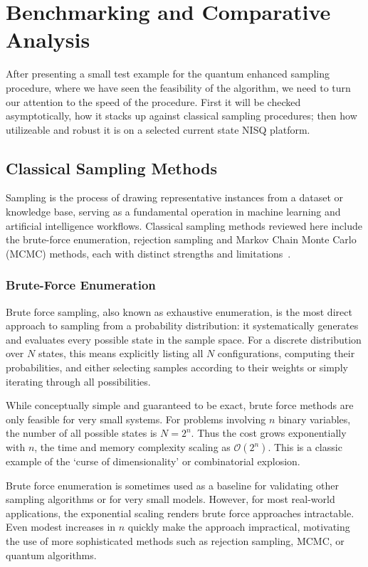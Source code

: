 \documentclass[encoding=utf8,british]{tumphthesis}
\begin{document}
\chapter{Benchmarking and Comparative Analysis}
After presenting a small test example for the quantum enhanced sampling procedure, where we have seen the feasibility of the algorithm, we need to turn our attention to 
the speed of the procedure. First it will be checked asymptotically, how it stacks up against classical sampling procedures; then how utilizeable and robust it is on a 
selected current state NISQ platform.

    \section{Classical Sampling Methods}
    \label{sect:Benchmark_classical}
        Sampling is the process of drawing representative instances from a dataset or knowledge base, serving as a fundamental operation in 
        machine learning and artificial intelligence workflows. Classical sampling methods reviewed here include the brute-force enumeration,
        rejection sampling and Markov Chain Monte Carlo (MCMC) methods, each with distinct strengths and limitations~\cite{Ghojogh2020}.
        
        \subsection{Brute-Force Enumeration}
            Brute force sampling, also known as exhaustive enumeration, is the most direct approach to sampling from a probability distribution: 
            it systematically generates and evaluates every possible state in the sample space. For a discrete distribution over $N$ states, this 
            means explicitly listing all $N$ configurations, computing their probabilities, and either selecting samples according to their 
            weights or simply iterating through all possibilities.

            While conceptually simple and guaranteed to be exact, brute force methods are only feasible for very small systems. For problems involving 
            $n$ binary variables, the number of all possible states is $N = 2^n$. Thus the cost grows exponentially with $n$, the time 
            and memory complexity scaling as $\mathcal{O}(2^n)$. This is a classic example of the `curse of dimensionality' or 
            combinatorial explosion.

            Brute force enumeration is sometimes used as a baseline for validating other sampling algorithms or for very small models. 
            However, for most real-world applications, the exponential scaling renders brute force approaches intractable. Even modest 
            increases in $n$ quickly make the approach impractical, motivating the use of more sophisticated methods such as rejection 
            sampling, MCMC, or quantum algorithms.
\end{document}
